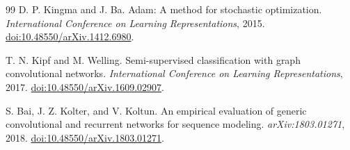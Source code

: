\documentclass[UTF8,12pt,a4paper]{ctexart}
\numberwithin{equation}{section}
\begin{document}
\begin{thebibliography}{99}
D. P. Kingma and J. Ba.
Adam: A method for stochastic optimization.
\emph{International Conference on Learning Representations}, 2015.
\href{https://doi.org/10.48550/arXiv.1412.6980}{doi:10.48550/arXiv.1412.6980}.

T. N. Kipf and M. Welling.
Semi-supervised classification with graph convolutional networks.
\emph{International Conference on Learning Representations}, 2017.
\href{https://doi.org/10.48550/arXiv.1609.02907}{doi:10.48550/arXiv.1609.02907}.

S. Bai, J. Z. Kolter, and V. Koltun.
An empirical evaluation of generic convolutional and recurrent networks for sequence modeling.
\emph{arXiv:1803.01271}, 2018.
\href{https://doi.org/10.48550/arXiv.1803.01271}{doi:10.48550/arXiv.1803.01271}.

\end{thebibliography}
\end{document}
